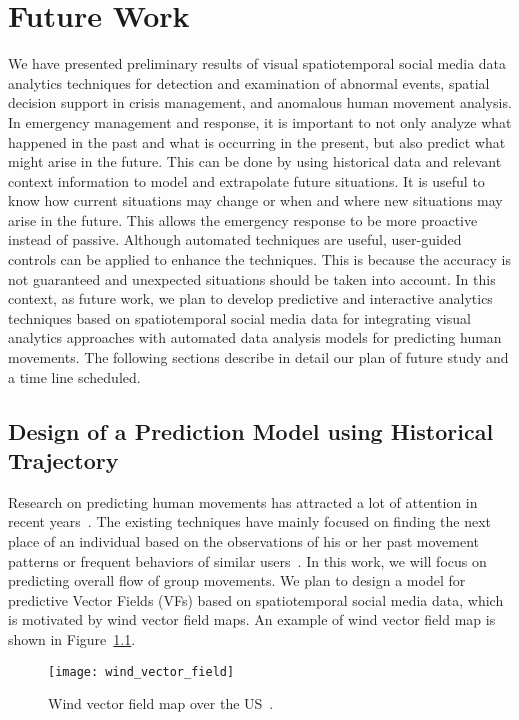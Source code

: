 \chapter{Future Work}

We have presented preliminary results of visual spatiotemporal social media data analytics techniques for detection and examination of abnormal events, spatial decision support in crisis management, and anomalous human movement analysis.
In emergency management and response, it is important to not only analyze what happened in the past and what is occurring in the present, but also predict what might arise in the future.
This can be done by using historical data and relevant context information to model and extrapolate future situations.
It is useful to know how current situations may change or when and where new situations may arise in the future.
This allows the emergency response to be more proactive instead of passive.
Although automated techniques are useful, user-guided controls can be applied to enhance the techniques.
This is because the accuracy is not guaranteed and unexpected situations should be taken into account.
In this context, as future work, we plan to develop predictive and interactive analytics techniques based on spatiotemporal social media data for integrating visual analytics approaches with automated data analysis models for predicting human movements.
The following sections describe in detail our plan of future study and a time line scheduled.

\section{Design of a Prediction Model using Historical Trajectory}
\label{sec:prediction_model}

Research on predicting human movements has attracted a lot of attention in recent years~\cite{Cho:2011:FAM,Jiang:2009:Ranking,Lin:2013:Predicting}.
The existing techniques have mainly focused on finding the next place of an individual based on the observations of his or her past movement patterns or frequent behaviors of similar users~\cite{Asahara:2011:PMP,Gambs:2012:NPP}.
In this work, we will focus on predicting overall flow of group movements.
We plan to design a model for predictive Vector Fields (VFs) based on spatiotemporal social media data, which is motivated by wind vector field maps.
An example of wind vector field map is shown in Figure~\ref{fig:wind}.
\begin{figure}[th]
	\centering
	\texttt{[image: wind\_vector\_field]}
	\caption{Wind vector field map over the US~\cite{Weather:2015:Wind}.}
	\label{fig:wind}
\end{figure}

